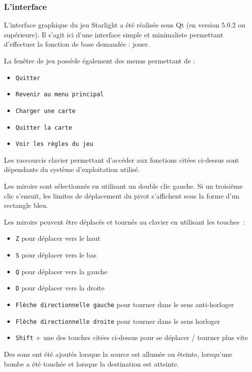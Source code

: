\documentclass[]{report}
\begin{document}
\subsubsection{L'interface}

L'interface graphique du jeu Starlight a été réalisée sous Qt (en version 5.0.2 ou supérieure).
Il s'agit ici d'une interface simple et minimaliste permettant d'effectuer la fonction de base 
demandée : jouer.

La fenêtre de jeu possède également des menus permettant de :

\begin{itemize}
    \item \texttt{Quitter}
    \item \texttt{Revenir au menu principal}
    \item \texttt{Charger une carte}
    \item \texttt{Quitter la carte}
    \item \texttt{Voir les règles du jeu}
\end{itemize}

Les raccourcis clavier permettant d'accéder aux fonctions citées ci-dessus sont dépendants
du système d'exploitation utilisé.

Les miroirs sont sélectionnés en utilisant un double clic gauche.
Si un troisième clic s’ensuit, les limites de déplacement du pivot s'affichent
sous la forme d'un rectangle bleu.

Les miroirs peuvent être déplacés et tournés au clavier en utilisant les touches~:

\begin{itemize}
	\item \texttt{Z} pour déplacer vers le haut
	\item \texttt{S} pour déplacer vers le bas
	\item \texttt{Q} pour déplacer vers la gauche
	\item \texttt{D} pour déplacer vers la droite
	\item \texttt{Flèche directionnelle gauche} pour tourner dans le sens
		anti-horloger
	\item \texttt{Flèche directionnelle droite} pour tourner dans le sens
		horloger
    \item \texttt{Shift} + une des touches citées ci-dessus pour se déplacer / tourner
        plus vite
\end{itemize}

Des sons ont été ajoutés lorsque la source est allumée ou éteinte, 
lorsqu'une bombe a été touchée et lorsque la destination
est atteinte.
\end{document}
